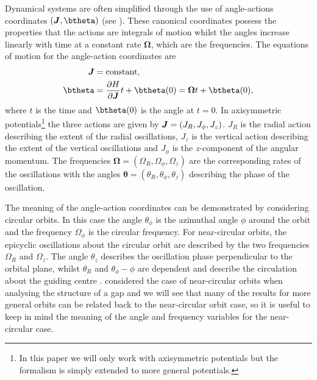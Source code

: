 \documentclass[useAMS,usenatbib,fleqn,a4paper]{mn2e}
\newcommand{\bs}[1]{\bmath{#1}}
\providecommand{\DIFaddtex}[1]{{\protect\color{blue}\uwave{#1}}} %
\providecommand{\DIFaddbegin}{} %
\providecommand{\DIFaddend}{} %
\providecommand{\DIFadd}[1]{\texorpdfstring{\DIFaddtex{#1}}{#1}} %
\begin{document}
Dynamical systems are often simplified through the use of angle-actions coordinates $(\bs{J},\btheta)$ (see \citealt{BinneyTremaine}). These canonical coordinates possess the properties that the actions are integrals of motion whilst the angles increase linearly with time at a constant rate $\boldsymbol{\Omega}$, which are the frequencies. The equations of motion for the angle-action coordinates are
\begin{equation}
\begin{split}
\bs{J}&=\mathrm{constant},\\
\btheta&=\frac{\partial H}{\partial\boldsymbol{J}}t+\btheta(0)=\boldsymbol{\Omega}t+\btheta(0),
\end{split}
\DIFaddbegin \label{angleactdef}
\DIFaddend \end{equation}
where $t$ is the time and $\btheta(0)$ is the angle at $t=0$. In axisymmetric potentials\footnote{In this paper we will only work with axisymmetric potentials but the formalism is simply extended to more general potentials.} the three actions are given by $\bs{J}=(J_R,J_\phi,J_z)$. $J_R$ is the radial action describing the extent of the radial oscillations, $J_z$ is the vertical action describing the extent of the vertical oscillations and $J_\phi$ is the $z$-component of the angular momentum. The frequencies $\boldsymbol{\Omega}=(\Omega_R,\Omega_\phi,\Omega_z)$  are the corresponding rates of the oscillations with the angles $\boldsymbol{\theta}=(\theta_R,\theta_\phi,\theta_z)$ describing the phase of the oscillation.

The meaning of the angle-action coordinates can be demonstrated by considering circular orbits. In this case the angle $\theta_\phi$ is the azimuthal angle $\phi$ around the orbit and the frequency $\Omega_\phi$ is the circular frequency. For near-circular orbits, the epicyclic oscillations about the circular orbit are described by the two frequencies $\Omega_R$ and $\Omega_z$. The angle $\theta_z$ describes the oscillation phase perpendicular to the orbital plane, whilst $\theta_R$ and $\theta_\phi-\phi$ are dependent and describe the circulation about the guiding centre \DIFaddbegin \DIFadd{\mbox{%
\citep[][equation 3.265]{BinneyTremaine}
}%
}\DIFaddend . \cite{ErkalBelokurov2015} considered the case of near-circular orbits when analysing the structure of a gap and we will see that many of the results for more general orbits can be related back to the near-circular orbit case, so it is useful to keep in mind the meaning of the angle and frequency variables for the near-circular case.
\end{document}
